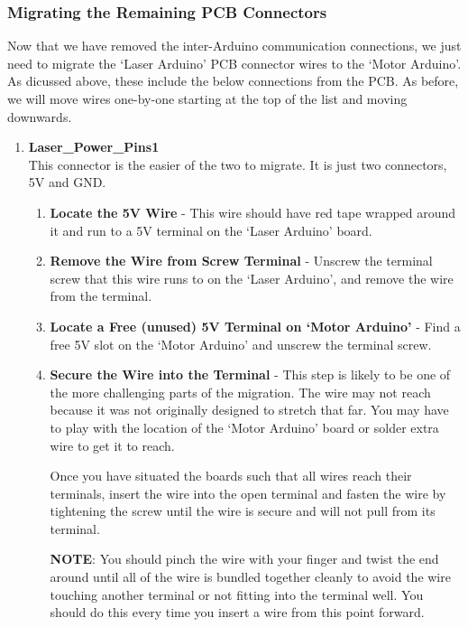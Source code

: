 \documentclass{article}
\begin{document}
\subsubsection{Migrating the Remaining PCB Connectors}
Now that we have removed the inter-Arduino communication connections, we just need to migrate the `Laser Arduino' PCB connector wires to the `Motor Arduino'. 
As dicussed above, these include the below connections from the PCB. As before, we will move wires one-by-one starting at the top of the list and moving downwards.
\begin{enumerate}
    \item \textbf{Laser\_Power\_Pins1}\\
        This connector is the easier of the two to migrate. It is just two connectors, 5V and GND. 
        \begin{enumerate}
            \item \textbf{Locate the 5V Wire} - This wire should have red tape wrapped around it and run to a 5V terminal on the `Laser Arduino' board.
            \item \textbf{Remove the Wire from Screw Terminal} - Unscrew the terminal screw that this wire runs to on the `Laser Arduino', and remove the wire from the terminal.
            \item \textbf{Locate a Free (unused) 5V Terminal on `Motor Arduino'} - Find a free 5V slot on the `Motor Arduino' and unscrew the terminal screw. 
            \item \textbf{Secure the Wire into the Terminal} - This step is likely to be one of the more challenging parts of the migration.
                The wire may not reach because it was not originally designed to stretch that far. You may have to play with the location of the `Motor Arduino' board 
                or solder extra wire to get it to reach. 

                \par Once you have situated the boards such that all wires reach their terminals, insert the wire into the 
                open terminal and fasten the wire by tightening the screw until the wire is secure and will not pull from its terminal. 

                \par \textbf{NOTE}: You should pinch the wire with your finger and twist the end around until all 
                of the wire is bundled together cleanly to avoid the wire touching another terminal or not fitting into the terminal well. You should do this every time you 
                insert a wire from this point forward.


\end{enumerate}
\end{enumerate}
\end{document}
